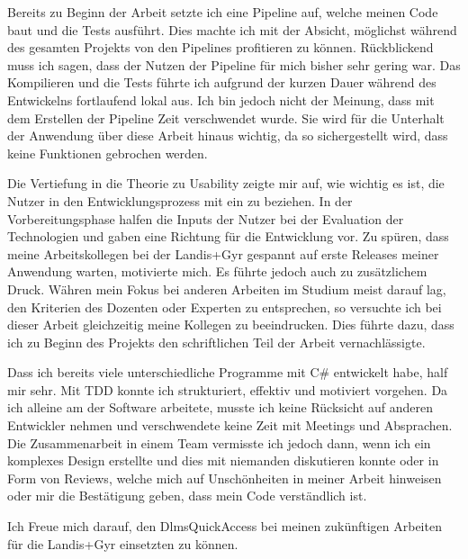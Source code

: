 Bereits zu Beginn der Arbeit setzte ich eine Pipeline auf, welche meinen Code baut und die Tests ausführt.
Dies machte ich mit der Absicht, möglichst während des gesamten Projekts von den Pipelines profitieren zu können.
Rückblickend muss ich sagen, dass der Nutzen der Pipeline für mich bisher sehr gering war.
Das Kompilieren und die Tests führte ich aufgrund der kurzen Dauer während des Entwickelns fortlaufend lokal aus.
Ich bin jedoch nicht der Meinung, dass mit dem Erstellen der Pipeline Zeit verschwendet wurde.
Sie wird für die Unterhalt der Anwendung über diese Arbeit hinaus wichtig, da so sichergestellt wird, dass keine Funktionen gebrochen werden.

Die Vertiefung in die Theorie zu Usability zeigte mir auf, wie wichtig es ist, die Nutzer in den Entwicklungsprozess mit ein zu beziehen.
In der Vorbereitungsphase halfen die Inputs der Nutzer bei der Evaluation der Technologien und gaben eine Richtung für die Entwicklung vor.
Zu spüren, dass meine Arbeitskollegen bei der Landis+Gyr gespannt auf erste Releases meiner Anwendung warten, motivierte mich.
Es führte jedoch auch zu zusätzlichem Druck.
Währen mein Fokus bei anderen Arbeiten im Studium meist darauf lag, den Kriterien des Dozenten oder Experten zu entsprechen, so versuchte ich bei dieser Arbeit gleichzeitig meine Kollegen zu beeindrucken.
Dies führte dazu, dass ich zu Beginn des Projekts den schriftlichen Teil der Arbeit vernachlässigte.

Dass ich bereits viele unterschiedliche Programme mit C\# entwickelt habe, half mir sehr.
Mit \ac{TDD} konnte ich strukturiert, effektiv und motiviert vorgehen.
Da ich alleine am der Software arbeitete, musste ich keine Rücksicht auf anderen Entwickler nehmen und verschwendete keine Zeit mit Meetings und Absprachen.
Die Zusammenarbeit in einem Team vermisste ich jedoch dann, wenn ich ein komplexes Design erstellte und dies mit niemanden diskutieren konnte oder in Form von Reviews, welche mich auf Unschönheiten in meiner Arbeit hinweisen oder mir die Bestätigung geben, dass mein Code verständlich ist.

Ich Freue mich darauf, den DlmsQuickAccess bei meinen zukünftigen Arbeiten für die Landis+Gyr einsetzten zu können.\dq



% 

